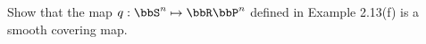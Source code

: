 Show that the map $q:\bbS^n\mapsto \bbR \bbP^n$ defined in Example 2.13(f) is a smooth covering map.